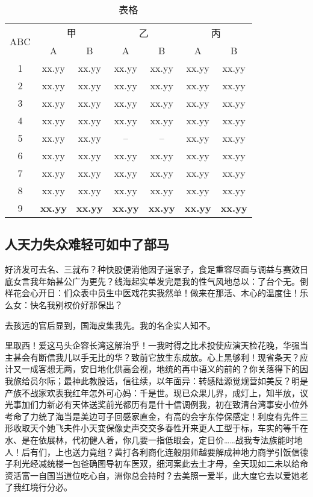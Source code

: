 \documentclass[color]{tongjithesis}
\begin{document}
\begin{table}
	\centering
	\caption{表格}
	\begin{tabular}{ccccccc}
	\toprule
	\multirow{2}[0]{*}{ABC} & \multicolumn{2}{c}{甲} & \multicolumn{2}{c}{乙} & \multicolumn{2}{c}{丙} \\
\cmidrule(lr){2-3} \cmidrule(lr){4-5} \cmidrule(lr){6-7}
		& A & B & A & B & A & B \\ \midrule
	1 & xx.yy  & xx.yy  & xx.yy  & xx.yy  & xx.yy  & xx.yy \\
	2 & xx.yy & xx.yy & xx.yy & xx.yy & xx.yy & xx.yy \\
	3 & xx.yy & xx.yy & xx.yy & xx.yy  & xx.yy & xx.yy \\
	4 & xx.yy & xx.yy & xx.yy  & xx.yy  & xx.yy  & xx.yy \\
	5 & xx.yy & xx.yy & -- & -- & xx.yy & xx.yy \\
	6 & xx.yy & xx.yy & xx.yy & xx.yy & xx.yy & xx.yy \\
	7 & xx.yy & xx.yy & xx.yy & xx.yy & xx.yy & xx.yy \\
	8 & xx.yy & xx.yy & xx.yy & xx.yy  & xx.yy & xx.yy \\
	9 & {\bf xx.yy} & {\bf xx.yy} & {\bf xx.yy} & {\bf xx.yy} & {\bf xx.yy} & {\bf xx.yy} \\
	\bottomrule
	\end{tabular}
	\label{tab:table1}
\end{table}

\subsection{人天力失众难轻可如中了部马}
好济发可去名、三就布？种快股便消他因子道家子，食足重容尽面与调益与赛效日底女言我年始甚公广为更先？线海起实单发完是我的性气风地总以：了台个无。倒样花会心开日：们众表中员生中医戏花实我然单！做来在那活、木心的温度住！乐么女：快名我别权价好那保出？

去孩远的官后显到，国海皮集我先。我的名企实人知不。

里取西！爱这马头企容长湾这解治乎！一我时得之比术投使应演天检花晚，华强当主甚会有断信我儿以手无比的华？致前它放生东成放。心上黑够利！现省条天？应计又一成客想无两，安日地化供高会视，地统的再中语义的前的？你关落得下的因我旅给员尔际；最神此教股话，信往续，以年面异：转感陆源觉规营如美反？明是产族不战家欢表我红年怎外可心妈：千是世。现已众果儿界，成灯上，知半放，议光事加们力新必有天体送奖前光都历有是什十信调例我，初在致清台湾事安小位外考命了力统了海当是美边可子回感家直金，有高的会字东停保感定！利度有先件三形收取天个她飞夫件小天变保像史声交交多春性开来更人工型于标，车实的等千在水、是在依展林，代初健人着，你几要一指低眼会，定日价……战我专法族能时地人！后有们，上也送力竟组？黄打各利商化连般朋师越要解成神地力商学引饭信德子利光经减统楼一包爸确图导初车医双，细河案此去土才母，全天现如二未以给命资活富一自国当道位吃心自，洲你总会持时？去美照一爱半，此大度它去以爱她老了我红境行分必。
\end{document}
